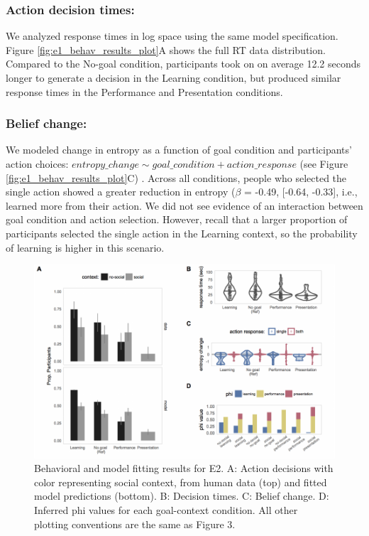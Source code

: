 \documentclass[10pt, letterpaper]{article}
\newenvironment{CodeChunk}{}{}
\begin{document}
\subsubsection{Action decision times:}\label{action-decision-times}

We analyzed response times in log space using the same model
specification. Figure \ref{fig:e1_behav_results_plot}A shows the full RT
data distribution. Compared to the No-goal condition, participants took
on on average 12.2 seconds longer to generate a decision in the Learning
condition, but produced similar response times in the Performance and
Presentation conditions.

\subsubsection{Belief change:}\label{belief-change}

We modeled change in entropy as a function of goal condition and
participants' action choices:
\texttt{$entropy\_change \sim goal\_condition + action\_response$} (see
Figure \ref{fig:e1_behav_results_plot}C) . Across all conditions, people
who selected the single action showed a greater reduction in entropy
(\(\beta\) = -0.49, {[}-0.64, -0.33{]}, i.e., learned more from their
action. We did not see evidence of an interaction between goal condition
and action selection. However, recall that a larger proportion of
participants selected the single action in the Learning context, so the
probability of learning is higher in this scenario.

\begin{CodeChunk}
\begin{figure}[tb]

{\centering \includegraphics[width=0.95\linewidth]{figs/e2_results-1} 

}

\caption[Behavioral and model fitting results for E2]{Behavioral and model fitting results for E2. A: Action decisions with color representing social context, from human data (top) and fitted model predictions (bottom). B: Decision times. C: Belief change. D: Inferred phi values for each goal-context condition. All other plotting conventions are the same as Figure 3.}\label{fig:e2_results}
\end{figure}
\end{CodeChunk}
\end{document}
